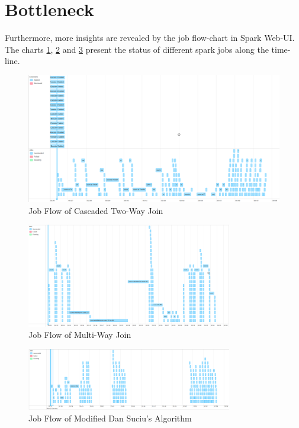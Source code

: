 \section{Bottleneck}
Furthermore, more insights are revealed by the job flow-chart in Spark Web-UI. The charts  \ref{fig:alibaba-two-jobs}, \ref{fig:alibaba-multi-jobs} and \ref{fig:alibaba-dan-jobs} present the status of different spark jobs along the time-line.
\begin{figure}[h!]
  \caption{Job Flow of Cascaded Two-Way Join}
  \label{fig:alibaba-two-jobs}
  \centering
    \includegraphics[width=1.0\textwidth]{img/alibaba-two-jobs}
\end{figure}
\begin{figure}[h!]
  \caption{Job Flow of Multi-Way Join}
  \label{fig:alibaba-multi-jobs}
  \centering
    \includegraphics[width=0.8\textwidth]{img/alibaba-multi-jobs}
\end{figure}
\begin{figure}[h!]
  \caption{Job Flow of Modified Dan Suciu's Algorithm}
  \label{fig:alibaba-dan-jobs}
  \centering
    \includegraphics[width=0.8\textwidth]{img/alibaba-dan-jobs}
\end{figure}
